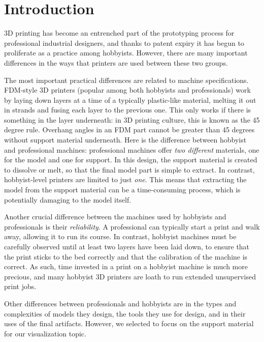 \documentclass{sigchi}
\begin{document}



\section{Introduction}
3D printing has become an entrenched part of the prototyping process for professional industrial designers, and thanks to patent expiry it has begun to proliferate as a practice among hobbyists.  However, there are many important differences in the ways that printers are used between these two groups.

The most important practical differences are related to machine specifications.  FDM-style 3D printers (popular among both hobbyists and professionals) work by laying down layers at a time of a typically plastic-like material, melting it out in strands and fusing each layer to the previous one.  This only works if there is something in the layer underneath: in 3D printing culture, this is known as the 45 degree rule.  Overhang angles in an FDM part cannot be greater than 45 degrees without support material underneath.  Here is the difference between hobbyist and professional machines: professional machines offer \emph{two different} materials, one for the model and one for support.  In this design, the support material is created to dissolve or melt, so that the final model part is simple to extract.  In contrast, hobbyist-level printers are limited to just \emph{one}.  This means that extracting the model from the support material can be a time-consuming process, which is potentially damaging to the model itself.

Another crucial difference between the machines used by hobbyists and professionals is their \emph{reliability}.  A professional can typically start a print and walk away, allowing it to run its course.  In contrast, hobbyist machines must be carefully observed until at least two layers have been laid down, to ensure that the print sticks to the bed correctly and that the calibration of the machine is correct.  As such, time invested in a print on a hobbyist machine is much more precious, and many hobbyist 3D printers are loath to run extended unsupervised print jobs.

Other differences between professionals and hobbyists are in the types and complexities of models they design, the tools they use for design, and in their uses of the final artifacts.  However, we selected to focus on the support material for our visualization topic.
\end{document}
